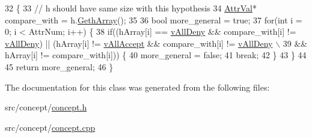 \begin{DoxyCode}
32                                                       \{
33     \textcolor{comment}{// h should have same size with this hypothesis}
34     \hyperlink{concept_8h_a9680d29b8d997e4adbf99481b65e897d}{AttrVal}* compare\_with = h.\hyperlink{class_hypothesis_a9f7689475f40bcd554b01ad7670aec8a}{GethArray}();
35     
36     \textcolor{keywordtype}{bool} more\_general = \textcolor{keyword}{true};
37     \textcolor{keywordflow}{for}(\textcolor{keywordtype}{int} i = 0; i < AttrNum; i++) \{
38     \textcolor{keywordflow}{if}((hArray[i] == \hyperlink{concept_8h_a9680d29b8d997e4adbf99481b65e897da11f228b43fc46c19132632500bcaf314}{vAllDeny} && compare\_with[i] != \hyperlink{concept_8h_a9680d29b8d997e4adbf99481b65e897da11f228b43fc46c19132632500bcaf314}{vAllDeny}) || (hArray[i] != 
      \hyperlink{concept_8h_a9680d29b8d997e4adbf99481b65e897da6e098ab4d58e23ef1a840e0a338ef96f}{vAllAccept} && compare\_with[i] != \hyperlink{concept_8h_a9680d29b8d997e4adbf99481b65e897da11f228b43fc46c19132632500bcaf314}{vAllDeny} \(\backslash\)
39         && hArray[i] != compare\_with[i])) \{
40         more\_general = \textcolor{keyword}{false};
41         \textcolor{keywordflow}{break};
42     \}
43     \}
44 
45     \textcolor{keywordflow}{return} more\_general;
46 \}
\end{DoxyCode}


The documentation for this class was generated from the following files\-:\begin{DoxyCompactItemize}
\item 
src/concept/\hyperlink{concept_8h}{concept.\-h}\item 
src/concept/\hyperlink{concept_8cpp}{concept.\-cpp}\end{DoxyCompactItemize}
